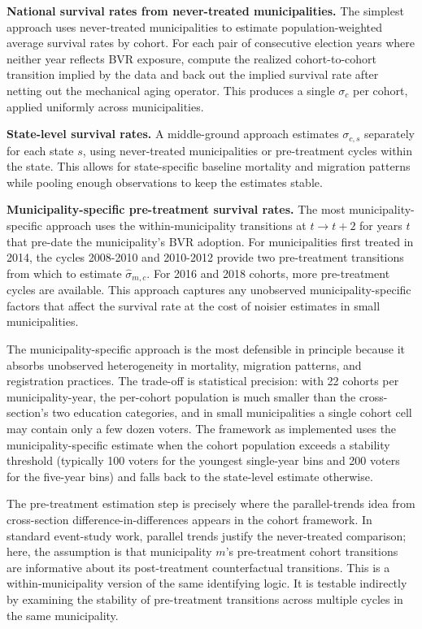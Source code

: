 \textbf{National survival rates from never-treated municipalities.} The simplest approach uses never-treated municipalities to estimate population-weighted average survival rates by cohort. For each pair of consecutive election years where neither year reflects BVR exposure, compute the realized cohort-to-cohort transition implied by the data and back out the implied survival rate after netting out the mechanical aging operator. This produces a single $\sigma_c$ per cohort, applied uniformly across municipalities.

\textbf{State-level survival rates.} A middle-ground approach estimates $\sigma_{c,s}$ separately for each state $s$, using never-treated municipalities or pre-treatment cycles within the state. This allows for state-specific baseline mortality and migration patterns while pooling enough observations to keep the estimates stable.

\textbf{Municipality-specific pre-treatment survival rates.} The most municipality-specific approach uses the within-municipality transitions at $t \to t+2$ for years $t$ that pre-date the municipality's BVR adoption. For municipalities first treated in 2014, the cycles 2008-2010 and 2010-2012 provide two pre-treatment transitions from which to estimate $\hat\sigma_{m,c}$. For 2016 and 2018 cohorts, more pre-treatment cycles are available. This approach captures any unobserved municipality-specific factors that affect the survival rate at the cost of noisier estimates in small municipalities.

The municipality-specific approach is the most defensible in principle because it absorbs unobserved heterogeneity in mortality, migration patterns, and registration practices. The trade-off is statistical precision: with 22 cohorts per municipality-year, the per-cohort population is much smaller than the cross-section's two education categories, and in small municipalities a single cohort cell may contain only a few dozen voters. The framework as implemented uses the municipality-specific estimate when the cohort population exceeds a stability threshold (typically 100 voters for the youngest single-year bins and 200 voters for the five-year bins) and falls back to the state-level estimate otherwise.

The pre-treatment estimation step is precisely where the parallel-trends idea from cross-section difference-in-differences appears in the cohort framework. In standard event-study work, parallel trends justify the never-treated comparison; here, the assumption is that municipality $m$'s pre-treatment cohort transitions are informative about its post-treatment counterfactual transitions. This is a within-municipality version of the same identifying logic. It is testable indirectly by examining the stability of pre-treatment transitions across multiple cycles in the same municipality.

